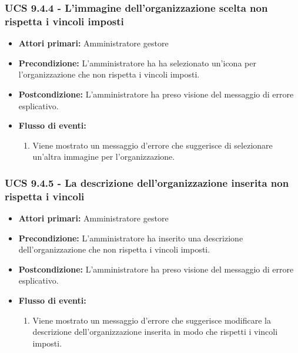 \subsubsection{UCS 9.4.4 - L'immagine dell'organizzazione scelta non rispetta i vincoli imposti}%
\begin{itemize}
\item \textbf{Attori primari:} Amministratore gestore
\item \textbf{Precondizione:} L'amministratore ha ha selezionato un'icona per l'organizzazione che non rispetta i vincoli imposti.
\item \textbf{Postcondizione:} L'amministratore ha preso visione del messaggio di errore esplicativo.
\item \textbf{Flusso di eventi:}
    \begin{enumerate}
    \item Viene mostrato un messaggio d'errore che suggerisce di selezionare un'altra immagine per l'organizzazione.
    \end{enumerate} 
\end{itemize}

\subsubsection{UCS 9.4.5 - La descrizione dell'organizzazione inserita non rispetta i vincoli}%
\begin{itemize}
\item \textbf{Attori primari:} Amministratore gestore
\item \textbf{Precondizione:} L'amministratore ha inserito una descrizione dell'organizzazione che non rispetta i vincoli imposti.
\item \textbf{Postcondizione:} L'amministratore ha preso visione del messaggio di errore esplicativo.
\item \textbf{Flusso di eventi:}
    \begin{enumerate}
    \item Viene mostrato un messaggio d'errore che suggerisce modificare la descrizione dell'organizzazione inserita in modo che rispetti i vincoli imposti.
    \end{enumerate} 
\end{itemize}

